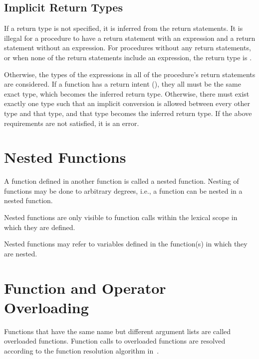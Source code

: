 \subsection{Implicit Return Types}
\label{Implicit_Return_Types}

If a return type is not specified, it is inferred from the return statements.
It is illegal for a procedure to have a return statement with an expression
and a return statement without an expression.
For procedures without any return statements, or when none of the
return statements include an expression, the return type is .

Otherwise, the types of the expressions in all of the procedure's
return statements are considered.
If a function has a  return intent (), they
all must be the same exact type, which becomes the inferred return type.
Otherwise, there must exist exactly one type such that an implicit conversion
is allowed between every other type and that type, and that type becomes the
inferred return type.
If the above requirements are not satisfied, it is an error.

\section{Nested Functions}
\label{Nested_Functions}

A function defined in another function is called a nested function.
Nesting of functions may be done to arbitrary degrees, i.e., a
function can be nested in a nested function.

Nested functions are only visible to function calls within the lexical scope
in which they are defined.

Nested functions may refer to variables defined in the function(s) in
which they are nested.


\section{Function and Operator Overloading}
\label{Function_Overloading}

Functions that have the same name but different argument lists are
called overloaded functions.  Function calls to overloaded functions
are resolved according to the function resolution algorithm in~.

